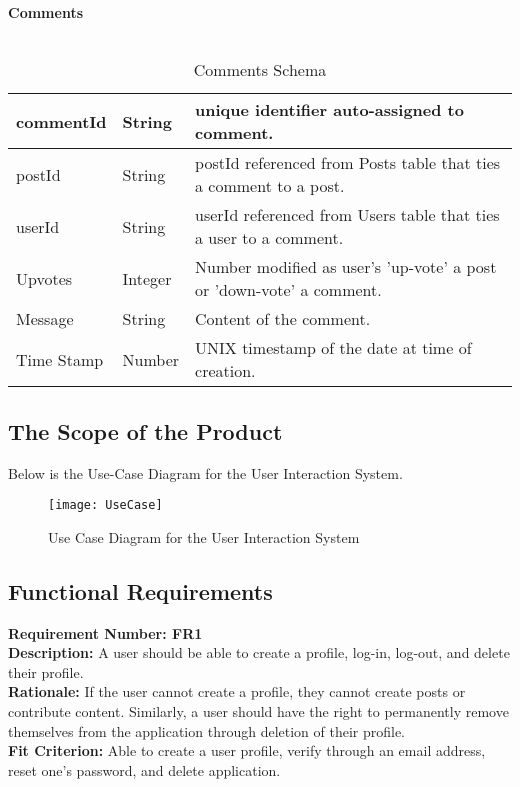 \documentclass[12pt,fleqn]{article}
\begin{document}
\\ \\ 
\textbf{Comments} \\ \\
\begin{table}[H]
\begin{tabular}{ |p{3cm}| p{2cm}| p{10cm}| }
\hline
commentId & String & unique identifier auto-assigned to comment. \\
\hline
postId & String & postId referenced from Posts table that ties a comment to a post.\\
\hline
userId & String & userId referenced from Users table that ties a user to a comment.\\
\hline
Upvotes & Integer & Number modified as user's 'up-vote' a post or 'down-vote' a comment. \\
\hline
Message & String & Content of the comment. \\
\hline
Time Stamp & Number & UNIX timestamp of the  date at time of creation. \\
\hline
\end{tabular}
\caption{Comments Schema} \label{tab:comments}
\end{table}

\subsection {The Scope of the Product}
Below is the Use-Case Diagram for the User Interaction System.
\begin{figure}[H]
\centering
\texttt{[image: UseCase]}
\caption{Use Case Diagram for the User Interaction System}
\label{fig:use-case}
\end{figure}

\subsection {Functional Requirements}

\begin{tcolorbox}
\textbf{Requirement Number: FR1}\\
\textbf{Description:} A user should be able to create a profile, log-in, log-out, and delete their profile.\\
\textbf{Rationale:} If the user cannot create a profile, they cannot create posts or contribute content.  Similarly, a user should have the right to permanently remove themselves from the application through deletion of their profile. \\
\textbf{Fit Criterion:} Able to create a user profile, verify through an email address, reset one's password, and delete application.
\end{tcolorbox}
\end{document}
